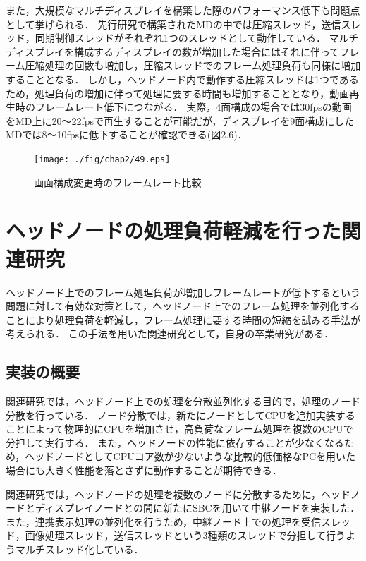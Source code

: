 また，大規模なマルチディスプレイを構築した際のパフォーマンス低下も問題点として挙げられる．
先行研究で構築されたMDの中では圧縮スレッド，送信スレッド，同期制御スレッドがそれぞれ1つのスレッドとして動作している．
マルチディスプレイを構成するディスプレイの数が増加した場合にはそれに伴ってフレーム圧縮処理の回数も増加し，圧縮スレッドでのフレーム処理負荷も同様に増加することとなる．
しかし，ヘッドノード内で動作する圧縮スレッドは1つであるため，処理負荷の増加に伴って処理に要する時間も増加することとなり，動画再生時のフレームレート低下につながる．
実際，4面構成の場合では30fpsの動画をMD上に20〜22fpsで再生することが可能だが，ディスプレイを9面構成にしたMDでは8〜10fpsに低下することが確認できる(図2.6)．

\begin{figure}[H]
  \hspace*{\fill}
  \texttt{[image: ./fig/chap2/49.eps]}
  \hspace*{\fill}
  \label{fig_2.6}
  \caption{画面構成変更時のフレームレート比較}
 \end{figure}


 \section{ヘッドノードの処理負荷軽減を行った関連研究}
 
ヘッドノード上でのフレーム処理負荷が増加しフレームレートが低下するという問題に対して有効な対策として，ヘッドノード上でのフレーム処理を並列化することにより処理負荷を軽減し，フレーム処理に要する時間の短縮を試みる手法が考えられる．
この手法を用いた関連研究として，自身の卒業研究がある．

\subsection*{実装の概要}

関連研究では，ヘッドノード上での処理を分散並列化する目的で，処理のノード分散を行っている．
ノード分散では，新たにノードとしてCPUを追加実装することによって物理的にCPUを増加させ，高負荷なフレーム処理を複数のCPUで分担して実行する．
また，ヘッドノードの性能に依存することが少なくなるため，ヘッドノードとしてCPUコア数が少ないような比較的低価格なPCを用いた場合にも大きく性能を落とさずに動作することが期待できる．

関連研究では，ヘッドノードの処理を複数のノードに分散するために，ヘッドノードとディスプレイノードとの間に新たにSBCを用いて中継ノードを実装した．
また，連携表示処理の並列化を行うため，中継ノード上での処理を受信スレッド，画像処理スレッド，送信スレッドという3種類のスレッドで分担して行うようマルチスレッド化している．

